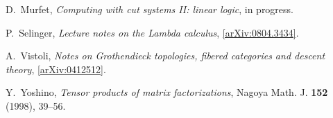 \documentclass[english,letter paper,12pt,leqno]{article}
\theoremstyle{example}
\numberwithin{equation}{section}
\begin{document}
\begin{thebibliography}{BHLS03}
D.~Murfet, \textsl{Computing with cut systems II: linear logic}, in progress.

P.~Selinger, \textsl{Lecture notes on the {L}ambda calculus}, \href{http://arxiv.org/abs/0804.3434}{[arXiv:0804.3434]}.

A.~Vistoli, \textsl{Notes on {G}rothendieck topologies, fibered categories and descent theory}, \href{http://arxiv.org/abs/math/0412512}{[arXiv:0412512]}.

Y.~Yoshino, \textsl{Tensor products of matrix factorizations}, Nagoya Math. J.
  \textbf{152} (1998), 39--56.
  
\end{thebibliography}
\end{document}
